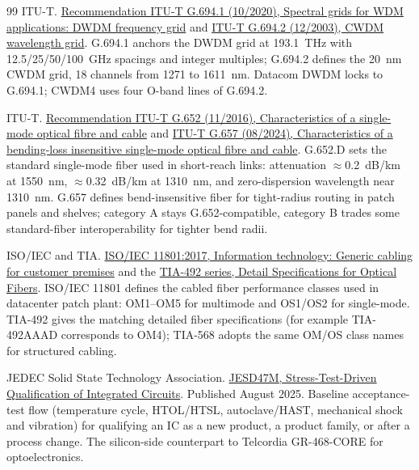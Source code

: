 \begin{thebibliography}{99}
ITU-T.
\newblock \href{https://www.itu.int/rec/T-REC-G.694.1/en}{Recommendation ITU-T G.694.1 (10/2020), Spectral grids for WDM applications: DWDM frequency grid}
and \href{https://www.itu.int/rec/T-REC-G.694.2/en}{ITU-T G.694.2 (12/2003), CWDM wavelength grid}.
\newblock G.694.1 anchors the DWDM grid at 193.1~THz with 12.5/25/50/100~GHz
spacings and integer multiples; G.694.2 defines the 20~nm CWDM grid, 18 channels
from 1271 to 1611~nm. Datacom DWDM locks to G.694.1; CWDM4 uses four O-band lines
of G.694.2.

ITU-T.
\newblock \href{https://www.itu.int/rec/T-REC-G.652/en}{Recommendation ITU-T G.652 (11/2016), Characteristics of a single-mode optical fibre and cable}
and \href{https://www.itu.int/rec/T-REC-G.657/en}{ITU-T G.657 (08/2024), Characteristics of a bending-loss insensitive single-mode optical fibre and cable}.
\newblock G.652.D sets the standard single-mode fiber used in short-reach links:
attenuation $\approx$0.2~dB/km at 1550~nm, $\approx$0.32~dB/km at 1310~nm, and
zero-dispersion wavelength near 1310~nm. G.657 defines bend-insensitive fiber for
tight-radius routing in patch panels and shelves; category A stays G.652-compatible,
category B trades some standard-fiber interoperability for tighter bend radii.

ISO/IEC and TIA.
\newblock \href{https://www.iso.org/standard/66763.html}{ISO/IEC 11801:2017, Information technology: Generic cabling for customer premises}
and the \href{https://www.tiaonline.org/}{TIA-492 series, Detail Specifications for Optical Fibers}.
\newblock ISO/IEC 11801 defines the cabled fiber performance classes used in
datacenter patch plant: OM1--OM5 for multimode and OS1/OS2 for single-mode. TIA-492
gives the matching detailed fiber specifications (for example TIA-492AAAD
corresponds to OM4); TIA-568 adopts the same OM/OS class names for structured
cabling.

JEDEC Solid State Technology Association.
\newblock \href{https://www.jedec.org/standards-documents/docs/jesd-47g}{JESD47M, Stress-Test-Driven Qualification of Integrated Circuits}.
\newblock Published August 2025. Baseline acceptance-test flow (temperature cycle,
HTOL/HTSL, autoclave/HAST, mechanical shock and vibration) for qualifying an IC as
a new product, a product family, or after a process change. The silicon-side
counterpart to Telcordia GR-468-CORE for optoelectronics.


\end{thebibliography}
